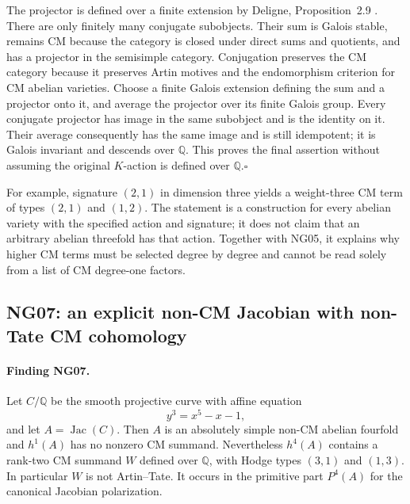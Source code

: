 \documentclass[11pt]{article}
\theoremstyle{remark}
\begin{document}
The projector is defined over a finite extension by Deligne,
Proposition~2.9 \cite{NGDeligne82}.  There are only finitely many conjugate subobjects.
Their sum is Galois stable, remains CM because the category is closed
under direct sums and quotients, and has a projector in the semisimple
category.  Conjugation preserves the CM category because it preserves
Artin motives and the endomorphism criterion for CM abelian varieties.
Choose a finite Galois extension defining the sum and a projector
onto it, and average the projector over its finite Galois group.
Every conjugate projector has image in the same subobject and is the
identity on it.  Their average consequently has the same image and
is still idempotent; it is Galois invariant and descends over
$\mathbb Q$.  This proves the final assertion without assuming the
original $K$-action is defined over $\mathbb Q$.\hfill$\square$

For example, signature $(2,1)$ in dimension three yields a weight-three
CM term of types $(2,1)$ and $(1,2)$.  The statement is a construction
for every abelian variety with the specified action and signature;
it does not claim that an arbitrary abelian threefold has that action.
Together with NG05, it explains why higher CM terms must be selected
degree by degree and cannot be read solely from a list of CM
degree-one factors.

\subsection{NG07: an explicit non-CM Jacobian with non-Tate CM cohomology}
\label{NG07}

\paragraph{Finding NG07.}
Let $C/\mathbb Q$ be the smooth projective curve with affine equation
\[
                            y^3=x^5-x-1,
\]
and let $A=\operatorname{Jac}(C)$.  Then $A$ is an absolutely simple
non-CM abelian fourfold and $h^1(A)$ has no nonzero CM summand.
Nevertheless $h^4(A)$ contains a rank-two CM summand $W$ defined over
$\mathbb Q$, with Hodge types $(3,1)$ and $(1,3)$.  In particular
$W$ is not Artin--Tate.  It occurs in the primitive part $P^4(A)$
for the canonical Jacobian polarization.
\end{document}
